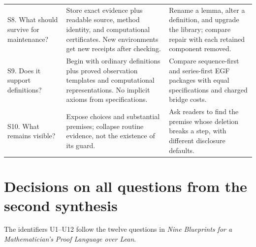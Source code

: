 \documentclass[11pt,letterpaper]{article}
\theoremstyle{definition}
\begin{document}
\begin{longtable}{@{}P{.21\textwidth}P{.43\textwidth}P{.28\textwidth}@{}}
S8. What should survive for maintenance? & Store exact evidence plus readable
source, method identity, and computational certificates. New environments get new
receipts after checking. & Rename a lemma, alter a definition, and upgrade the
library; compare repair with each retained component removed.\\
S9. Does it support definitions? & Begin with ordinary definitions plus proved
observation templates and computational representations. No implicit axioms from
specifications. & Compare sequence-first and series-first EGF packages with equal
specifications and charged bridge costs.\\
S10. What remains visible? & Expose choices and substantial premises; collapse
routine evidence, not the existence of its guard. & Ask readers to find the
premise whose deletion breaks a step, with different disclosure defaults.\\
\bottomrule
\end{longtable}
\endgroup

\section{Decisions on all questions from the second synthesis}\label{app:questionsU}
The identifiers U1--U12 follow the twelve questions in
\emph{Nine Blueprints for a Mathematician's Proof Language over Lean}\cite{review}.
\end{document}
